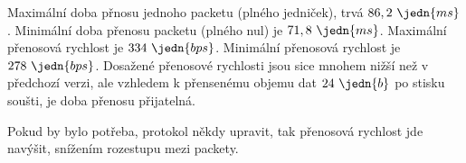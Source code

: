Maximální doba přnosu jednoho packetu (plného jedniček), trvá $86,2~\jedn{ms}$. Minimální doba přenosu packetu (plného nul) je $71,8~\jedn{ms}$. Maximální přenosová rychlost je $334~\jedn{bps}$. Minimální přenosová rychlost je $278~\jedn{bps}$. Dosažené přenosové rychlosti jsou sice mnohem nižší než v předchozí verzi, ale vzhledem k přensenému objemu dat $24~\jedn{b}$ po stisku soušti, je doba přenosu přijatelná.

Pokud by bylo potřeba, protokol někdy upravit, tak přenosová rychlost jde navýšit, snížením rozestupu mezi packety.


